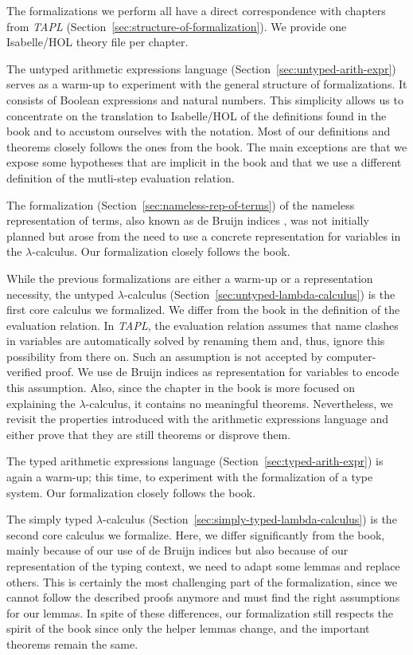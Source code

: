 The formalizations we perform all have a direct correspondence with chapters from \emph{TAPL}
(Section~\ref{sec:structure-of-formalization}). We provide one Isabelle/HOL theory file per chapter.

The untyped arithmetic expressions language (Section~\ref{sec:untyped-arith-expr}) serves as a
warm-up to experiment with the general structure of formalizations. It consists of Boolean
expressions and natural numbers. This simplicity allows us to concentrate on the translation to
Isabelle/HOL of the definitions found in the book and to accustom ourselves with the notation. Most
of our definitions and theorems closely follows the ones from the book. The main exceptions are
that we expose some hypotheses that are implicit in the book and that we use a different definition
of the mutli-step evaluation relation.

The formalization (Section~\ref{sec:nameless-rep-of-terms}) of the nameless representation of terms,
also known as de Bruijn indices \cite{bruijn-1972-indices}, was not initially planned but arose
from the need to use a concrete representation for variables in the $\lambda$-calculus. Our
formalization closely follows the book.

While the previous formalizations are either a warm-up or a representation necessity, the untyped
$\lambda$-calculus (Section~\ref{sec:untyped-lambda-calculus}) is the first core calculus we
formalized. We differ from the book in the definition of the evaluation relation. In \emph{TAPL},
the evaluation relation assumes that name clashes in variables are automatically solved by renaming
them and, thus, ignore this possibility from there on. Such an assumption is not accepted by
computer-verified proof. We use de Bruijn indices as representation for variables to encode this
assumption. Also, since the chapter in the book is more focused on explaining the
$\lambda$-calculus, it contains no meaningful theorems. Nevertheless, we revisit the properties
introduced with the arithmetic expressions language and either prove that they are still theorems or
disprove them.

The typed arithmetic expressions language (Section~\ref{sec:typed-arith-expr}) is again a warm-up;
this time, to experiment with the formalization of a type system. Our formalization closely follows
the book.

The simply typed $\lambda$-calculus (Section~\ref{sec:simply-typed-lambda-calculus}) is the second
core calculus we formalize. Here, we differ significantly from the book, mainly because of our use
of de Bruijn indices but also because of our representation of the typing context, we need to
adapt some lemmas and replace others. This is certainly the most challenging part of the
formalization, since we cannot follow the described proofs anymore and must find the right
assumptions for our lemmas. In spite of these differences, our formalization still respects the
spirit of the book since only the helper lemmas change, and the important theorems remain the same.

